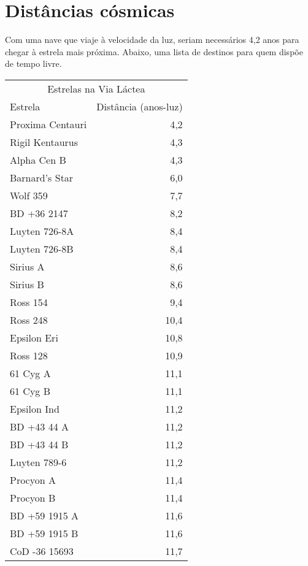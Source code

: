 \documentclass[a4paper,oneside]{article}
\begin{document}
\section{Distâncias cósmicas}

Com uma nave que viaje à velocidade da luz, seriam necessários 4,2 anos para
chegar à estrela mais próxima. Abaixo, uma lista de destinos para quem dispõe
de tempo livre.

\begin{center}
  \begin{tabular}{lr}
    \multicolumn{2}{c}{Estrelas na Via Láctea}\\[8pt]
    Estrela          & Distância (anos-luz)\\[5pt]
    Proxima Centauri & 4,2\\
    Rigil Kentaurus  & 4,3\\
    Alpha Cen B      & 4,3\\
    Barnard's Star   & 6,0\\
    Wolf 359         & 7,7\\
    BD +36 2147      & 8,2\\
    Luyten 726-8A    & 8,4\\
    Luyten 726-8B    & 8,4\\
    Sirius A         & 8,6\\
    Sirius B         & 8,6\\
    Ross 154         & 9,4\\
    Ross 248         & 10,4\\
    Epsilon Eri      & 10,8\\
    Ross 128         & 10,9\\
    61 Cyg A         & 11,1\\
    61 Cyg B         & 11,1\\
    Epsilon Ind      & 11,2\\
    BD +43 44 A      & 11,2\\
    BD +43 44 B      & 11,2\\
    Luyten 789-6     & 11,2\\
    Procyon A        & 11,4\\
    Procyon B        & 11,4\\
    BD +59 1915 A    & 11,6\\
    BD +59 1915 B    & 11,6\\
    CoD -36 15693    & 11,7
  \end{tabular}
\end{center}
\end{document}
